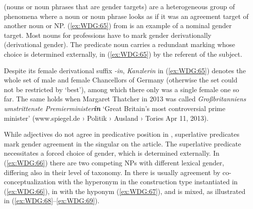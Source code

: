 \documentclass[output=collectionpaper]{langsci/langscibook}
\begin{document}
%

 (nouns or noun phrases that are gender targets) are a heterogeneous group of phenomena where a noun or noun phrase looks as if it was an agreement target of another noun or NP. (\ref{ex:WDG:65}) from  is an example of a nominal gender target. Most  nouns for professions have to mark gender derivationally (derivational gender). The predicate noun carries a redundant marking whose choice is determined externally, in (\ref{ex:WDG:65}) by the referent of the subject.

%

Despite its female derivational suffix \textit{-in}, \textit{Kanzlerin} in (\ref{ex:WDG:65}) denotes the whole set of male and female Chancellors of Germany (otherwise the set could not be restricted by `best'), among which there only was a single female one so far. The same holds when Margaret Thatcher in 2013 was called \textit{Großbritanniens umstrittenste Premierminister\textbf{in}} `Great Britain's most controversial prime minister' (www.spiegel.de › Politik › Ausland › Tories Apr 11, 2013).

While adjectives do not agree in predicative position in , superlative predicates mark gender agreement in the singular on the article. The superlative predicate necessitates a forced choice of gender, which is determined externally. In (\ref{ex:WDG:66}) there are two competing NPs with different lexical gender, differing also in their level of taxonomy. In  there is usually agreement by co-conceptualization with the hyperonym in the construction type instantiated in (\ref{ex:WDG:66}), in  with the hyponym (\ref{ex:WDG:67}), and  is mixed, as illustrated in (\ref{ex:WDG:68}--\ref{ex:WDG:69}).
\end{document}
